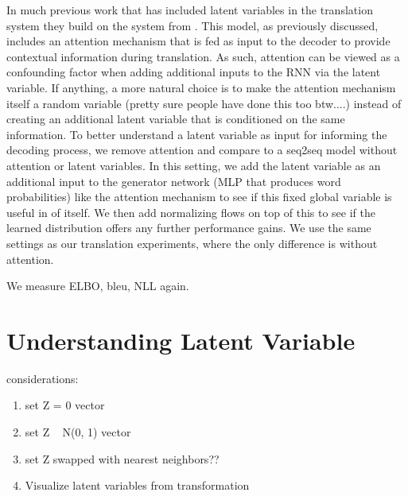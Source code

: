 In much previous work that has included latent variables in the translation system they build on the system from \cite{bahndanau et. al.} . This model, as previously discussed, includes an attention mechanism that is fed as input to the decoder to provide contextual information during translation. As such, attention can be viewed as a confounding factor when adding additional inputs to the RNN via the latent variable. If anything, a more natural choice is to make the attention mechanism itself a random variable (pretty sure people have done this too btw....) instead of creating an additional latent variable that is conditioned on the same information. To better understand a latent variable as input for informing the decoding process, we remove attention and compare to a seq2seq model without attention or latent variables. In this setting, we add the latent variable as an additional input to the generator network (MLP that produces word probabilities) like the attention mechanism to see if this fixed global variable is useful in of itself. We then add normalizing flows on top of this to see if the learned distribution offers any further performance gains. We use the same settings as our translation experiments, where the only difference is without attention.

We measure ELBO, bleu, NLL again.



\section{Understanding Latent Variable}

considerations:
\begin{enumerate}
	\item set Z = 0 vector
	\item set Z ~ N(0, 1) vector
	\item set Z swapped with nearest neighbors??
	\item Visualize latent variables from transformation
\end{enumerate}